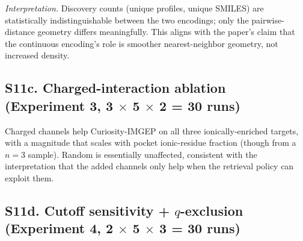 \documentclass[journal=jcisd8,manuscript=suppinfo]{achemso}
\begin{document}
\emph{Interpretation.} Discovery counts (unique profiles, unique SMILES) are statistically indistinguishable between the two encodings; only the pairwise-distance geometry differs meaningfully. This aligns with the paper's claim that the continuous encoding's role is smoother nearest-neighbor geometry, not increased density.

\subsection*{S11c. Charged-interaction ablation (Experiment 3, 3 $\times$ 5 $\times$ 2 = 30 runs)}

\begin{table}[ht]
\centering
\caption{Curiosity-IMGEP and Random with 5-channel (add: ligand-positive/protein-negative and ligand-negative/protein-positive) vs.\ 3-channel descriptors, per target. Numbers are mean $\pm$ SD unique profiles per run (10 seeds for 3-channel, 5 seeds for 5-channel).}
\label{tab:charged}
\end{table}

Charged channels help Curiosity-IMGEP on all three ionically-enriched targets, with a magnitude that scales with pocket ionic-residue fraction (though from a $n = 3$ sample). Random is essentially unaffected, consistent with the interpretation that the added channels only help when the retrieval policy can exploit them.

\subsection*{S11d. Cutoff sensitivity + $q$-exclusion (Experiment 4, 2 $\times$ 5 $\times$ 3 = 30 runs)}
\end{document}
